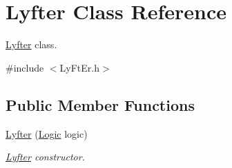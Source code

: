 \hypertarget{class_lyfter}{\section{Lyfter Class Reference}
\label{class_lyfter}
}


\hyperlink{class_lyfter}{Lyfter} class.  




{\ttfamily \#include $<$Ly\+Ft\+Er.\+h$>$}

\subsection*{Public Member Functions}
\begin{DoxyCompactItemize}
\item 
\hyperlink{class_lyfter_a18926c2dc4ede883dd8253c0fb6bdab6}{Lyfter} (\hyperlink{class_logic}{Logic} logic)
\begin{DoxyCompactList}\small\item\em \hyperlink{class_lyfter}{Lyfter} constructor. \end{DoxyCompactList}\end{DoxyCompactItemize}
